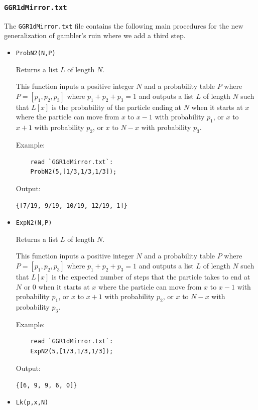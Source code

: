 \documentclass[reqno]{amsart}
\theoremstyle{definition}
\theoremstyle{definition}
\theoremstyle{remark}
\begin{document}
\subsubsection{\lstinline{GGR1dMirror.txt}}\label{appendix:mirror}
The \lstinline{GGR1dMirror.txt} file contains the following main procedures for the new generalization of gambler's ruin where we add a third step.

\begin{itemize}
\item \lstinline{ProbN2(N,P)}

    Returns a list $L$ of length $N$.
    
    This function inputs a positive integer $N$ and a probability table $P$ where $P=[p_1,p_2,p_3]$ where $p_1+p_2+p_3=1$ and outputs a list $L$ of length $N$ such that $L[x]$ is the probability of the particle ending at $N$ when it starts at $x$ where the particle can move from $x$ to $x-1$ with probability $p_1$, or $x$ to $x+1$ with probability $p_2$, or $x$ to $N-x$ with probability $p_3$.

    Example:
    
    \begin{lstlisting}
    read `GGR1dMirror.txt`:
    ProbN2(5,[1/3,1/3,1/3]);
    \end{lstlisting}
    Output:
    
    \lstinline!{[7/19, 9/19, 10/19, 12/19, 1]}!

    \item \lstinline{ExpN2(N,P)}

    Returns a list $L$ of length $N$.
    
    This function inputs a positive integer $N$ and a probability table $P$ where $P=[p_1,p_2,p_3]$ where $p_1+p_2+p_3=1$ and outputs a list $L$ of length $N$ such that $L[x]$ is the expected number of steps that the particle takes to end at $N$ or $0$ when it starts at $x$ where the particle can move from $x$ to $x-1$ with probability $p_1$, or $x$ to $x+1$ with probability $p_2$, or $x$ to $N-x$ with probability $p_3$.

    Example:
    
    \begin{lstlisting}
    read `GGR1dMirror.txt`:
    ExpN2(5,[1/3,1/3,1/3]);
    \end{lstlisting}
    Output:
    
    \lstinline!{[6, 9, 9, 6, 0]}!


     \item \lstinline{Lk(p,x,N)}


\end{itemize}
\end{document}
